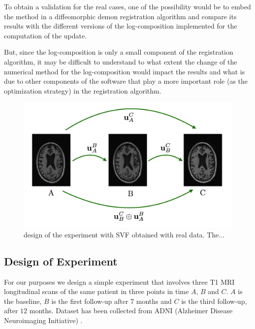 To obtain a validation for the real cases, one of the possibility would be to embed the method in a diffeomorphic demon registration algorithm and compare its results with the different versions of the log-composition implemented for the computation of the update.

But, since the log-composition is only a small component of the registration algorithm, it may be difficult to understand to what extent the change of the numerical method for the log-composition would impact the results and what is due to other components of the software that play a more important role (as the optimization strategy) in the registration algorithm.

\begin{figure}[!ht]
	\centering
	\includegraphics[scale=0.30]{figures/three_brains_problem.pdf}
	\caption{design of the experiment with SVF obtained with real data. The... }
	\label{fig:three_brains_problem}
\end{figure}

\subsection{Design of Experiment}
For our purposes we design a simple experiment that involves three T1 MRI longitudinal scans of the same patient in three points in time $A$, $B$ and $C$. $A$ is the baseline, $B$ is the first follow-up after $7$ months and $C$ is the third follow-up, after $12$ months. Dataset has been collected from ADNI (Alzheimer Disease Neuroimaging Initiative) \cite{jack2008alzheimer}.


